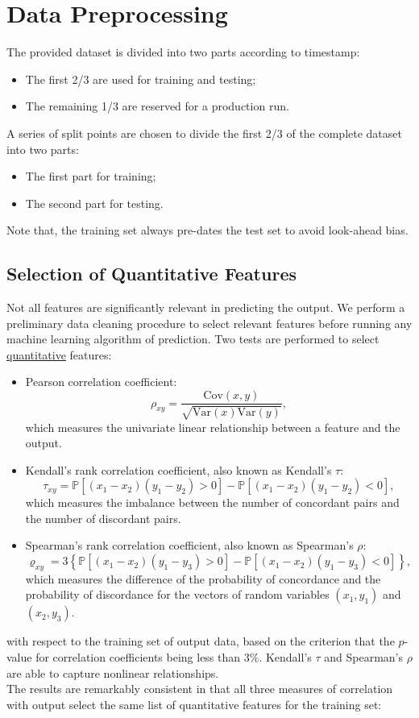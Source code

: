 \documentclass[
11pt, %
a4paper, %
oneside, %
headinclude,footinclude, %
BCOR5mm, %
]{scrartcl}
\begin{document}
\section{Data Preprocessing}
The provided dataset is divided into two parts according to timestamp:
\begin{itemize}[noitemsep]
\item The first 2/3 are used for training and testing;
\item The remaining 1/3 are reserved for a production run.
\end{itemize}
A series of split points are chosen to divide the first 2/3 of the complete dataset into two parts:
\begin{itemize}[noitemsep]
\item The first part for training;
\item The second part for testing.
\end{itemize}
Note that, the training set always pre-dates the test set to avoid look-ahead bias.

\subsection{Selection of Quantitative Features}

Not all features are significantly relevant in predicting the output. We perform a preliminary data cleaning procedure to select relevant features before
running any machine learning algorithm of prediction. Two tests are performed to select \underline{quantitative} features:
\begin{itemize}[noitemsep]
\item Pearson correlation coefficient:
$$
\rho_{xy} = \frac{\text{Cov}(x,y)}{\sqrt{\text{Var}(x)\text{Var}(y)}},
$$
which measures the univariate linear relationship between a feature and the output.
\item Kendall's rank correlation coefficient, also known as Kendall's $\tau$:
$$
\tau_{xy} = \mathbb{P}[(x_1 - x_2)(y_1 - y_2)>0] - \mathbb{P}[(x_1 - x_2)(y_1 - y_2)<0],
$$
which measures the imbalance between the number of concordant pairs and the number of discordant pairs.
\item Spearman's rank correlation coefficient, also known as Spearman's $\rho$:
$$
\varrho_{xy} = 3 \left\{ \mathbb{P}[(x_1-x_2)(y_1-y_3)>0] -  \mathbb{P}[(x_1-x_2)(y_1-y_3)<0]\right\},
$$
which measures the difference of the probability of concordance and the probability of discordance for the vectors of random variables $(x_1,y_1)$ and $(x_2,y_3)$.
\end{itemize}
with respect to the training set of output data, based on the criterion that the $p$-value for correlation coefficients being less than $3\%$. Kendall's $\tau$ and Spearman's $\rho$ are able to capture nonlinear relationships.\\
\newline
The results are remarkably consistent in that all three measures of correlation with output select the same list of quantitative features for the training set:
\end{document}
